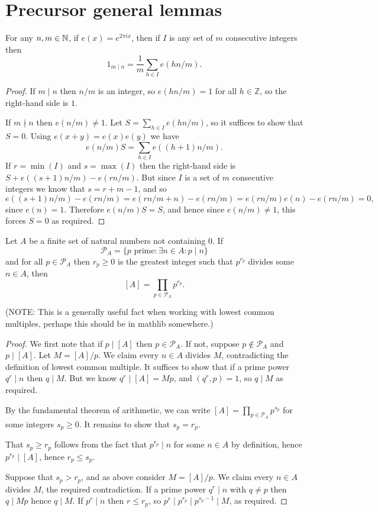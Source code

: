 \section{Precursor general lemmas}

\begin{lemma}\label{lem:orthogonality}
  \leanok
For any $n,m\in\mathbb{N}$, if $e(x) = e^{2\pi ix}$, then if $I$ is any set of $m$ consecutive integers then
\[1_{m\mid n}=\frac{1}{m}\sum_{h\in I}e(h n/m).\]
\end{lemma}
\begin{proof}
  \leanok
If $m\mid n$ then $n/m$ is an integer, so $e(hn/m)=1$ for all $h\in \mathbb{Z}$, so the right-hand side is $1$.

If $m\nmid n$ then $e(n/m)\neq 1$. Let $S=\sum_{h\in I}e(hn/m)$, so it suffices to show that $S=0$. Using $e(x+y)=e(x)e(y)$ we have
\[e(n/m)S = \sum_{h\in I}e((h+1)n/m).\]
If $r=\min(I)$ and $s=\max(I)$ then the right-hand side is $S + e((s+1)n/m)-e(rn/m)$. But since $I$ is a set of $m$ consecutive integers we know that $s=r+m-1$, and so
\[e((s+1)n/m)-e(rn/m) = e(rn/m+n)-e(rn/m)=e(rn/m)e(n)-e(rn/m)=0,\]
since $e(n)=1$. Therefore $e(n/m)S=S$, and hence since $e(n/m)\neq 1$, this forces $S=0$ as required.
\end{proof}

\begin{lemma}\label{lem:lcm_desc}
Let $A$ be a finite set of natural numbers not containing $0$. If
\[\mathcal{P}_A = \{ p \textrm{ prime}: \exists n\in A : p \mid n\}\]
and for all $p\in \mathcal{P}_A$ then $r_p\geq 0$ is the greatest integer such that $p^{r_p}$ divides some $n\in A$, then
\[[A]=\prod_{p\in\mathcal{P}_A}p^{r_p}.\]
\end{lemma}
(NOTE: This is a generally useful fact when working with lowest common multiples, perhaps this should be in mathlib somewhere.)
\begin{proof}
We first note that if $p\mid [A]$ then $p\in \mathcal{P}_A$. If not, suppose $p\not\in\mathcal{P}_A$ and $p\mid [A]$. Let $M=[A]/p$. We claim every $n\in A$ divides $M$, contradicting the definition of lowest common multiple. It suffices to show that if a prime power $q^r\mid n$ then $q\mid M$. But we know $q^r\mid [A]=Mp$, and $(q^r,p)=1$, so $q\mid M$ as required.

By the fundamental theorem of arithmetic, we can write $[A] = \prod_{p\in \mathcal{P}_A}p^{s_p}$ for some integers $s_p\geq 0$. It remains to show that $s_p=r_p$.

That $s_p\geq r_p$ follows from the fact that $p^{r_p}\mid n$ for some $n\in A$ by definition, hence $p^{r_p}\mid [A]$, hence $r_p\leq s_p$.

Suppose that $s_p>r_p$, and as above consider $M=[A]/p$. We claim every $n\in A$ divides $M$, the required contradiction. If a prime power $q^r\mid n$ with $q\neq p$ then $q\mid Mp$ hence $q\mid M$. If $p^r\mid n$ then $r\leq r_p$, so $p^r\mid p^{r_p}\mid p^{s_p-1}\mid M$, as required.
\end{proof}

